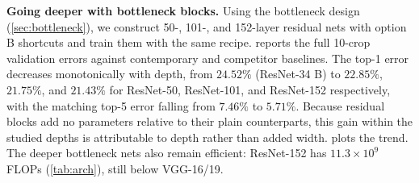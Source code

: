 \begin{table}[t]
\centering
\caption{ResNet-34 shortcut-option ablation on ImageNet validation (\%, 10-crop),
against the plain-34 baseline. \emph{Source: derived subset of Table 3
(\texttt{derived\_from\_table3\_shortcut\_options.md}); exact.}}
\label{tab:shortcut}
\small
{}
\end{table}

\noindent\textbf{Going deeper with bottleneck blocks.}
Using the bottleneck design (\cref{sec:bottleneck}), we construct 50-, 101-, and
152-layer residual nets with option B shortcuts and train them with the same
recipe.  reports the full 10-crop validation errors against
contemporary \plainnet{} and competitor baselines. The top-1 error decreases
monotonically with depth, from $24.52\%$ (ResNet-34 B) to $22.85\%$, $21.75\%$,
and $21.43\%$ for ResNet-50, ResNet-101, and ResNet-152 respectively, with the
matching top-5 error falling from $7.46\%$ to $5.71\%$. Because residual blocks
add no parameters relative to their plain counterparts, this gain within the
studied depths is attributable to depth rather than added width.
 plots the trend. The deeper bottleneck nets also remain
efficient: ResNet-152 has $11.3\times10^{9}$ FLOPs (\cref{tab:arch}), still below
VGG-16/19.

